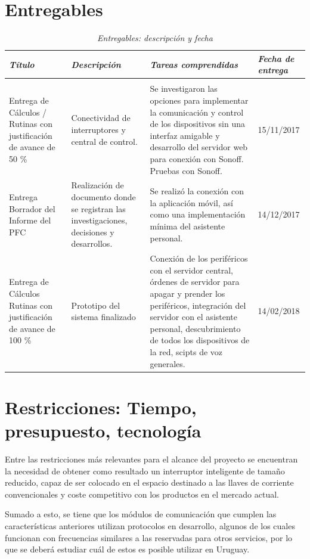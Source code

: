 \section{Entregables}
\begin{table}[H]
\begin{tabular}{p{}p{}p{}p{}}
\toprule 
\textit{Título} & \textit{Descripción} & \textit{Tareas comprendidas} & \textit{Fecha de entrega} \\
\midrule \\
\rowcolor{green!5} Entrega de Cálculos / Rutinas con justificación de avance de 50 \% & Conectividad de interruptores y central de control. & Se investigaron las opciones para implementar la comunicación y control de los dispositivos sin una interfaz amigable y desarrollo del servidor web para conexión con Sonoff. Pruebas con Sonoff. & 15/11/2017 \\
Entrega Borrador del Informe del PFC & Realización de documento donde se registran las investigaciones, decisiones y desarrollos.
 & Se realizó la conexión con la aplicación móvil, así como una implementación mínima del asistente personal. & 14/12/2017 \\
\rowcolor{green!5} Entrega de Cálculos \/ Rutinas con justificación de avance de 100 \% & Prototipo del sistema finalizado & Conexión de los periféricos con el servidor central, órdenes de servidor para apagar y prender los periféricos, integración del servidor con el asistente personal, descubrimiento de todos los dispositivos de la red, scipts de voz generales. & 14/02/2018 \\
\bottomrule
\end{tabular}
 \caption{\textit{Entregables: descripción y fecha}}
\end{table}

\section{Restricciones: Tiempo, presupuesto, tecnología}

Entre las restricciones más relevantes para el alcance del proyecto se encuentran la necesidad de obtener como resultado un interruptor inteligente de tamaño reducido, capaz de ser colocado en el espacio destinado a las llaves de corriente convencionales y coste competitivo con los productos en el mercado actual. 

Sumado a esto, se tiene que los módulos de comunicación que cumplen las características anteriores utilizan protocolos en desarrollo, algunos de los cuales funcionan con frecuencias similares a las reservadas para otros servicios, por lo que se deberá estudiar cuál de estos es posible utilizar en Uruguay.

